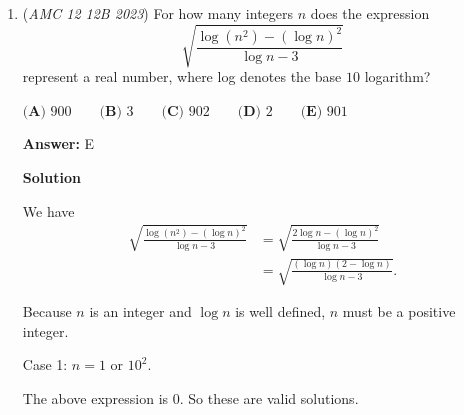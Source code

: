 \begin{enumerate}
 Sketching the graph and noting the multiplicity of the roots, we see that there are $\boxed{C) 6}$ positive intervals.

 



\textbf{Solution 6: Solution 3 with powers}

When the range of \( P(x) \) is from \( -\infty \) to \( 1 \), the sign is negative because in  

 $(x - 1)^1 (x - 2)^2 (x - 3)^3 \cdots (x - 10)^{10}$,the terms corresponding to \( x = 1, 3, 5, 7, \) and \( 9 \) are all negative, and since they have odd exponents, they contribute a negative sign.  The other terms with even exponents (like \( (x - 2)^2 \), \( (x - 4)^4 \), etc.) are positive regardless of the sign inside, so they don't affect the overall sign. However, in the range\( \ 1 \) to \( \ 2 \), the power of $1$ flips, causing this range to be positive. For the range $2$ - $3$, the sign of any even inside the exponent doesn't matter, so this range stays positive. Continueing this pattern, We see the pattern is $+, +, -, -,$ and so on. there are 3 complete cycles, so $3 * 2 =$ $\boxed{\textbf{(C) 6}}$~BlueKite

 


	\item (\textit{AMC 12 12B 2023}) For how many integers $n$ does the expression
 \[\sqrt{\frac{\log (n^2) - (\log n)^2}{\log n - 3}}\]represent a real number, where log denotes the base $10$ logarithm?


 $\textbf{(A) }900 \qquad \textbf{(B) }3\qquad \textbf{(C) }902 \qquad \textbf{(D) } 2  \qquad \textbf{(E) }901$

 \textbf{Answer: }E



\textbf{Solution}

We have
 \begin{align*} \sqrt{\frac{\log \left( n^2 \right) - \left( \log n \right)^2}{\log n - 3}} & = \sqrt{\frac{2 \log n - \left( \log n \right)^2}{\log n - 3}} \\ & = \sqrt{\frac{\left( \log n \right) \left( 2 - \log n\right)}{\log n - 3}} . \end{align*}


 Because $n$ is an integer and $\log n$ is well defined, $n$ must be a positive integer.

 Case 1: $n = 1$ or $10^2$.

 The above expression is 0. So these are valid solutions.


\end{enumerate}
